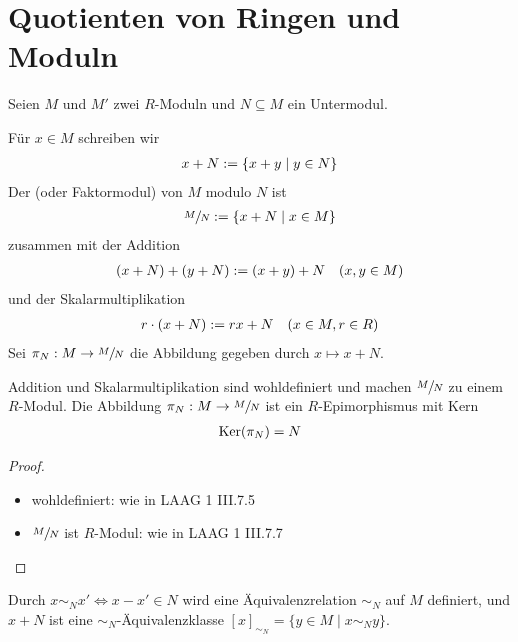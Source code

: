\section{Quotienten von Ringen und Moduln}

Seien $M$ und $M'$ zwei $R$-Moduln und $N\subseteq M$ ein Untermodul.

\begin{definition}[Quotientenmodul]
	Für $x\in M$ schreiben wir
	\begin{align}
		x+N:=\{x+y\mid y\in N\}\notag
	\end{align}
	Der  (oder Faktormodul) von $M$ modulo $N$ ist
	\begin{align}
		\sfrac{M}{N}:=\{x+N\mid x\in M\}\notag
	\end{align}
	zusammen mit der Addition
	\begin{align}
		(x+N)+(y+N):=(x+y)+N\quad (x,y\in M)\notag
	\end{align}
	und der Skalarmultiplikation
	\begin{align}
		r\cdot (x+N) := rx+N\quad (x\in M,r\in R)\notag
	\end{align}
	Sei $\pi_N:M\to \sfrac{M}{N}$ die Abbildung gegeben durch $x\mapsto x+N$.
\end{definition}

\begin{lemma}
	Addition und Skalarmultiplikation sind wohldefiniert und machen $\sfrac{M}{N}$ zu einem $R$-Modul. Die Abbildung $\pi_N:M\to \sfrac{M}{N}$ ist ein $R$-Epimorphismus mit Kern
	\begin{align}
		\operatorname{Ker}(\pi_N)=N\notag
	\end{align}
\end{lemma}
\begin{proof}
	\begin{itemize}
		\item wohldefiniert: wie in LAAG 1 III.7.5 %
		\item $\sfrac{M}{N}$ ist $R$-Modul: wie in LAAG 1 III.7.7 %
	\end{itemize}
\end{proof}

\begin{remark}
	Durch $x\sim_N x' \iff x-x'\in N$ wird eine Äquivalenzrelation $\sim_N$ auf $M$ definiert, und $x+N$ ist eine $\sim_N$-Äquivalenzklasse $[x]_{\sim_N}=\{y\in M\mid x\sim_N y\}$.
\end{remark}

